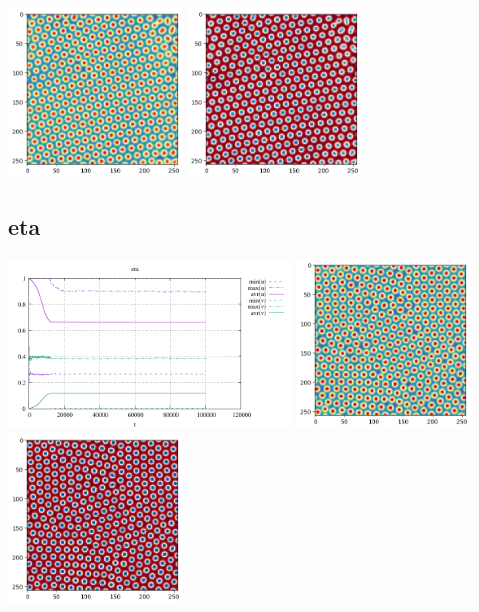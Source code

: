 \begin{center}
\includegraphics[height=4.5cm]{python_codes/fieldstone_171/results/zeta2_solution_final_u.png}
\includegraphics[height=4.5cm]{python_codes/fieldstone_171/results/zeta2_solution_final_v.png}
\end{center}

\subsection*{eta}
\begin{center}
\includegraphics[height=4.5cm]{python_codes/fieldstone_171/results/eta_stats}
\includegraphics[height=4.5cm]{python_codes/fieldstone_171/results/eta_solution_final_u.png}
\includegraphics[height=4.5cm]{python_codes/fieldstone_171/results/eta_solution_final_v.png}
\end{center}

